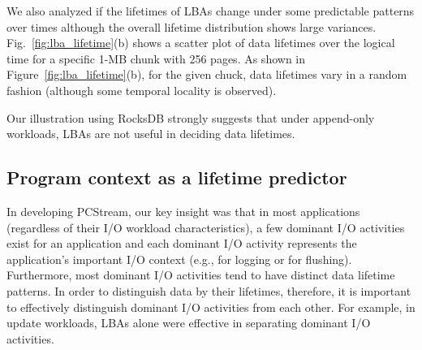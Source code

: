 We also analyzed 
if the lifetimes of LBAs change under some predictable patterns over times 
although the overall lifetime distribution shows large variances.
Fig.~\ref{fig:lba_lifetime}(b) shows a scatter plot of data lifetimes over the logical time 
for a specific 1-MB chunk with 256 pages. 
As shown in Figure~\ref{fig:lba_lifetime}(b), 
for the given chuck, data lifetimes vary in a random fashion
(although some temporal locality is observed).

Our illustration using RocksDB strongly suggests that under append-only
workloads, LBAs are not useful in deciding data lifetimes.

\vspace{-5pt}
\subsection{Program context as a lifetime predictor}
In developing {\sf PCStream}, our key insight was that in most applications 
(regardless of their I/O workload characteristics), 
a few dominant I/O activities exist for an application
and each dominant I/O activity   
represents the application's important I/O context (e.g., for logging or for flushing).
Furthermore, most dominant I/O activities tend to have distinct data lifetime patterns.
In order to distinguish data by their lifetimes, therefore, 
it is important to effectively distinguish dominant I/O activities from each other.  
For example, in update workloads, 
LBAs alone were effective in separating dominant I/O activities.  

